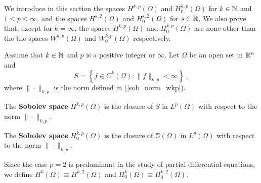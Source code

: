 We introduce in this section the spaces $\displaystyle H^{k,p}(\Omega)$ and
$\displaystyle H^{k,p}_0(\Omega)$ for $k \in \mathbb{N}$ and
$1 \leq p \leq \infty$, and the spaces
$\displaystyle H^{s,2}(\Omega)$ and $\displaystyle H^{s,2}_0(\Omega)$
for $s\in \mathbb{R}$.  We also prove that, except for $k=\infty$, the spaces
$\displaystyle H^{k,p}(\Omega)$ and $\displaystyle H^{k,p}_0(\Omega)$ are
none other than the the spaces
$\displaystyle W^{k,p}(\Omega)$ and $\displaystyle W^{k,p}_0(\Omega)$
respectively.

\begin{defn} \label{sob_H_spaces}
Assume that $k\in \mathbb{N}$ and $p$ is a positive integer or $\infty$.
Let $\Omega$ be an open set in $\displaystyle \mathbb{R}^n$ and
\[
S = \left\{ f \in C^k(\Omega) :  \|f\|_{k,p} < \infty \right\} \ ,
\]
where $\|\cdot\|_{k,p}$ is the norm defined in (\ref{sob_norm_wkp}).

The {\bfseries Sobolev space}
$\displaystyle H^{k,p}(\Omega)$ is the closure of $S$ in
$\displaystyle L^p(\Omega)$ with respect to the norm $\|\cdot\|_{k,p}$.

The {\bfseries Sobolev space}
$\displaystyle H^{k,p}_0(\Omega)$ is the closure of $\DD(\Omega)$ in
$\displaystyle L^p(\Omega)$ with respect to the norm $\|\cdot\|_{k,p}$.

Since the case $p=2$ is predominant in the study of partial
differential equations, we define
$\displaystyle H^k(\Omega) \equiv H^{k,2}(\Omega)$ and
$\displaystyle H^k_0(\Omega) \equiv H^{k,2}_0(\Omega)$.
\end{defn}


